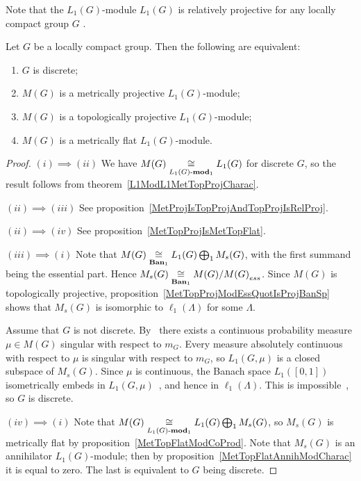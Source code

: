 Note that the $L_1(G)$-module $L_1(G)$ is relatively projective for any locally
compact group $G$ \cite[exercise 7.1.17]{HelBanLocConvAlg}.

\begin{proposition}\label{L1MetTopProjAndMetrFlatOfMeasAlg} Let $G$ be 
a locally compact group. Then the following are equivalent:

\begin{enumerate}[label = (\roman*)]
    \item $G$ is discrete;

    \item $M(G)$ is a metrically projective $L_1(G)$-module;

    \item $M(G)$ is a topologically projective $L_1(G)$-module;

    \item $M(G)$ is a metrically flat $L_1(G)$-module.
\end{enumerate}
\end{proposition}
\begin{proof} 
$(i)\implies (ii)$ We have $M(G)\mathrel{\mathop{\cong}\limits_{L_1(G)\text{-}\mathbf{mod}_1}}L_1(G)$ for
discrete $G$, so the result follows from theorem~\ref{L1ModL1MetTopProjCharac}. 

$(ii)\implies (iii)$ See
proposition~\ref{MetProjIsTopProjAndTopProjIsRelProj}.

$(ii)\implies (iv)$ See proposition~\ref{MetTopProjIsMetTopFlat}.

$(iii)\implies (i)$ Note that $M(G)\mathrel{\mathop{\cong}\limits_{\mathbf{Ban}_1}}
L_1(G)\bigoplus_1 M_s(G)$, with the first summand being the essential part. 
Hence  $M_s(G)\mathrel{\mathop{\cong}\limits_{\mathbf{Ban}_1}}M(G)/{M(G)}_{ess}$. Since $M(G)$ is 
topologically projective, proposition~\ref{MetTopProjModEssQuotIsProjBanSp} 
shows that $M_s(G)$ is isomorphic to $\ell_1(\Lambda)$ for some $\Lambda$.

Assume that $G$ is not discrete. By~\cite[section 19.26]{HewRossAbstrHarmAnalVol1} 
there exists a continuous probability measure $\mu\in M(G)$ singular with 
respect to $m_G$. Every measure absolutely continuous with respect to $\mu$ is 
singular with respect to $m_G$, so $L_1(G,\mu)$ is a closed subspace 
of $M_s(G)$. Since $\mu$ is continuous, the Banach space $L_1([0,1])$ 
isometrically embeds 
in $L_1(G,\mu)$~\cite[theorem 4.4.14]{DalDasLauStrBanSpContFuncAsDualSp}, and 
hence in $\ell_1(\Lambda)$. This is 
impossible~\cite[corollary 4.4.18]{DalDasLauStrBanSpContFuncAsDualSp}, so $G$ is
discrete.

$(iv)\implies (i)$ Note that $M(G)\mathrel{\mathop{\cong}\limits_{L_1(G)\text{-}\mathbf{mod}_1}}
L_1(G)\bigoplus_1 M_s(G)$, so $M_s(G)$ is metrically flat by
proposition~\ref{MetTopFlatModCoProd}. Note that $M_s(G)$ is an annihilator
$L_1(G)$-module; then by proposition~\ref{MetTopFlatAnnihModCharac} it is equal
to zero. The last is equivalent to $G$ being discrete.
\end{proof}

